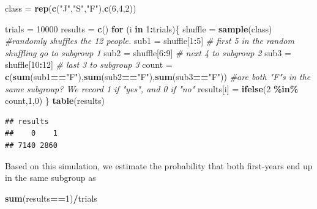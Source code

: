 \documentclass[
]{book}
\newenvironment{Shaded}{\begin{snugshade}}{\end{snugshade}}
\newcommand{\CommentTok}[1]{\textcolor[rgb]{0.56,0.35,0.01}{\textit{#1}}}
\newcommand{\ControlFlowTok}[1]{\textcolor[rgb]{0.13,0.29,0.53}{\textbf{#1}}}
\newcommand{\DecValTok}[1]{\textcolor[rgb]{0.00,0.00,0.81}{#1}}
\newcommand{\FunctionTok}[1]{\textcolor[rgb]{0.13,0.29,0.53}{\textbf{#1}}}
\newcommand{\NormalTok}[1]{#1}
\newcommand{\OtherTok}[1]{\textcolor[rgb]{0.56,0.35,0.01}{#1}}
\newcommand{\SpecialCharTok}[1]{\textcolor[rgb]{0.81,0.36,0.00}{\textbf{#1}}}
\newcommand{\StringTok}[1]{\textcolor[rgb]{0.31,0.60,0.02}{#1}}
\theoremstyle{definition}
\theoremstyle{definition}
\theoremstyle{definition}
\theoremstyle{definition}
\theoremstyle{remark}
\begin{document}
\begin{Shaded}
\begin{Highlighting}[]
\NormalTok{class }\OtherTok{=} \FunctionTok{rep}\NormalTok{(}\FunctionTok{c}\NormalTok{(}\StringTok{"J"}\NormalTok{,}\StringTok{"S"}\NormalTok{,}\StringTok{"F"}\NormalTok{),}\FunctionTok{c}\NormalTok{(}\DecValTok{6}\NormalTok{,}\DecValTok{4}\NormalTok{,}\DecValTok{2}\NormalTok{))}

\NormalTok{trials }\OtherTok{=} \DecValTok{10000}
\NormalTok{results }\OtherTok{=} \FunctionTok{c}\NormalTok{()}
\ControlFlowTok{for}\NormalTok{ (i }\ControlFlowTok{in} \DecValTok{1}\SpecialCharTok{:}\NormalTok{trials)\{}
\NormalTok{  shuffle }\OtherTok{=} \FunctionTok{sample}\NormalTok{(class) }\CommentTok{\#randomly shuffles the 12 people.}
\NormalTok{  sub1 }\OtherTok{=}\NormalTok{ shuffle[}\DecValTok{1}\SpecialCharTok{:}\DecValTok{5}\NormalTok{]  }\CommentTok{\# first 5 in the random shuffling go to subgroup 1}
\NormalTok{  sub2 }\OtherTok{=}\NormalTok{ shuffle[}\DecValTok{6}\SpecialCharTok{:}\DecValTok{9}\NormalTok{] }\CommentTok{\# next 4 to subgroup 2}
\NormalTok{  sub3 }\OtherTok{=}\NormalTok{ shuffle[}\DecValTok{10}\SpecialCharTok{:}\DecValTok{12}\NormalTok{] }\CommentTok{\# last 3 to subgroup 3}
\NormalTok{  count }\OtherTok{=} \FunctionTok{c}\NormalTok{(}\FunctionTok{sum}\NormalTok{(sub1}\SpecialCharTok{==}\StringTok{"F"}\NormalTok{),}\FunctionTok{sum}\NormalTok{(sub2}\SpecialCharTok{==}\StringTok{"F"}\NormalTok{),}\FunctionTok{sum}\NormalTok{(sub3}\SpecialCharTok{==}\StringTok{"F"}\NormalTok{))}
  \CommentTok{\#are both "F"s in the same subgroup? We record 1 if "yes", and 0 if "no"}
\NormalTok{  results[i] }\OtherTok{=} \FunctionTok{ifelse}\NormalTok{(}\DecValTok{2} \SpecialCharTok{\%in\%}\NormalTok{ count,}\DecValTok{1}\NormalTok{,}\DecValTok{0}\NormalTok{)}
\NormalTok{\}}
\FunctionTok{table}\NormalTok{(results)}
\end{Highlighting}
\end{Shaded}

\begin{verbatim}
## results
##    0    1 
## 7140 2860
\end{verbatim}

Based on this simulation, we estimate the probability that both first-years end up in the same subgroup as

\begin{Shaded}
\begin{Highlighting}[]
\FunctionTok{sum}\NormalTok{(results}\SpecialCharTok{==}\DecValTok{1}\NormalTok{)}\SpecialCharTok{/}\NormalTok{trials}
\end{Highlighting}
\end{Shaded}
\end{document}
